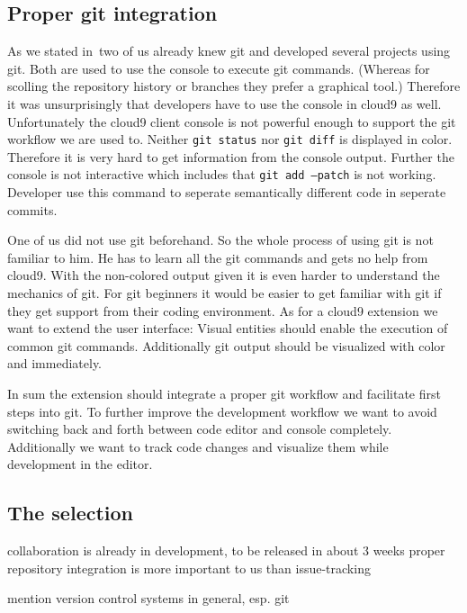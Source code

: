 \subsection{Proper git integration}
As we stated in~ two of us already knew git and developed several projects using git.
Both are used to use the console to execute git commands.
(Whereas for scolling the repository history or branches they prefer a graphical tool.)
Therefore it was unsurprisingly that developers have to use the console in cloud9 as well.
Unfortunately the cloud9 client console is not powerful enough to support the git workflow we are used to.
Neither \texttt{git status} nor \texttt{git diff} is displayed in color.
Therefore it is very hard to get information from the console output.
Further the console is not interactive which includes that \texttt{git add --patch} is not working.
Developer use this command to seperate semantically different code in seperate commits.

One of us did not use git beforehand.
So the whole process of using git is not familiar to him.
He has to learn all the git commands and gets no help from cloud9.
With the non-colored output given it is even harder to understand the mechanics of git.
For git beginners it would be easier to get familiar with git if they get support from their coding environment.
As for a cloud9 extension we want to extend the user interface: 
Visual entities should enable the execution of common git commands.
Additionally git output should be visualized with color and immediately.

In sum the extension should integrate a proper git workflow and facilitate first steps into git.
To further improve the development workflow we want to avoid switching back and forth between code editor and console completely.
Additionally we want to track code changes and visualize them while development in the editor.

\subsection{The selection}

collaboration is already in development, to be released in about 3 weeks
proper repository integration is more important to us than issue-tracking

mention version control systems in general, esp. git




